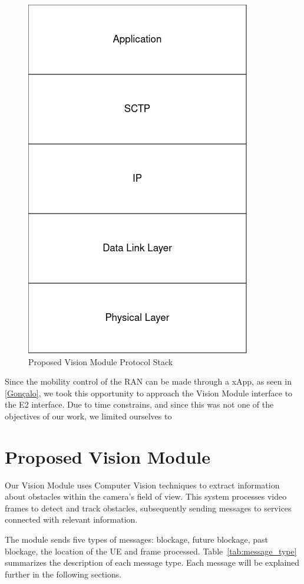\begin{figure}[H]
    \centering
    \includegraphics[width=0.35\linewidth]{figures/VisionModule_ProtocolStack.drawio(2)}
    \caption[Proposed Vision Module Protocol Stack]{Proposed Vision Module Protocol Stack}
    \label{fig:stack}
\end{figure}

Since the mobility control of the RAN can be made through a xApp, as seen in \ref{Gonçalo}, we took this opportunity to approach the Vision Module interface to the E2 interface.
Due to time constrains, and since this was not one of the objectives of our work, we limited ourselves to


\section{Proposed Vision Module}\label{sec:prop_vision}
Our Vision Module uses Computer Vision techniques to extract information about obstacles within the camera's field of view.
This system processes video frames to detect and track obstacles, subsequently sending messages to services connected with relevant information.

The module sends five types of messages: blockage, future blockage, past blockage, the location of the UE and frame processed.
Table~\ref{tab:message_type} summarizes the description of each message type.
Each message will be explained further in the following sections.

